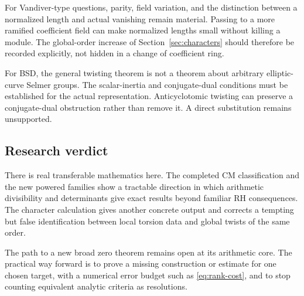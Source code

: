 For Vandiver-type questions, parity, field variation, and the distinction between a normalized length and actual vanishing remain material. Passing to a more ramified coefficient field can make normalized lengths small without killing a module. The global-order increase of Section~\ref{sec:characters} should therefore be recorded explicitly, not hidden in a change of coefficient ring.

For BSD, the general twisting theorem is not a theorem about arbitrary elliptic-curve Selmer groups. The scalar-inertia and conjugate-dual conditions must be established for the actual representation. Anticyclotomic twisting can preserve a conjugate-dual obstruction rather than remove it. A direct substitution remains unsupported.

\subsection{Research verdict}

There is real transferable mathematics here. The completed CM classification and the new powered families show a tractable direction in which arithmetic divisibility and determinants give exact results beyond familiar RH consequences. The character calculation gives another concrete output and corrects a tempting but false identification between local torsion data and global twists of the same order.

The path to a new broad zero theorem remains open at its arithmetic core. The practical way forward is to prove a missing construction or estimate for one chosen target, with a numerical error budget such as \eqref{eq:rank-cost}, and to stop counting equivalent analytic criteria as resolutions.
